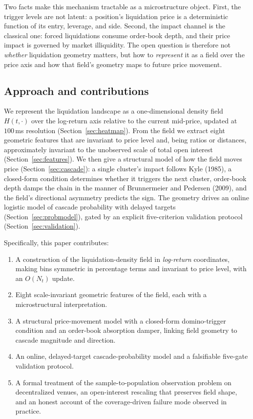 \documentclass[11pt,a4paper]{article}
\theoremstyle{definition}
\theoremstyle{plain}
\begin{document}
Two facts make this mechanism tractable as a microstructure object. First, the trigger levels are
not latent: a position's liquidation price is a deterministic function of its entry, leverage, and
side. Second, the impact channel is the classical one: forced liquidations consume order-book
depth, and their price impact is governed by market illiquidity. The open question is therefore not
\emph{whether} liquidation geometry matters, but how to \emph{represent} it as a field over the
price axis and how that field's geometry maps to future price movement.

\subsection{Approach and contributions}

We represent the liquidation landscape as a one-dimensional density field $H(t,\cdot)$ over the
log-return axis relative to the current mid-price, updated at $100\,$ms resolution
(Section~\ref{sec:heatmap}). From the field we extract eight geometric features that are invariant
to price level and, being ratios or distances, approximately invariant to the unobserved scale of
total open interest (Section~\ref{sec:features}). We then give a structural model of how the field
moves price (Section~\ref{sec:cascade}): a single cluster's impact follows Kyle (1985), a
closed-form condition determines whether it triggers the next cluster, order-book depth damps the
chain in the manner of Brunnermeier and Pedersen (2009), and the field's directional asymmetry
predicts the sign. The geometry drives an online logistic model of cascade probability with delayed
targets (Section~\ref{sec:probmodel}), gated by an explicit five-criterion validation protocol
(Section~\ref{sec:validation}).

Specifically, this paper contributes:
\begin{enumerate}
  \item A construction of the liquidation-density field in \emph{log-return} coordinates, making
        bins symmetric in percentage terms and invariant to price level, with an $O(N_t)$ update.
  \item Eight scale-invariant geometric features of the field, each with a microstructural
        interpretation.
  \item A structural price-movement model with a closed-form domino-trigger condition and an
        order-book absorption damper, linking field geometry to cascade magnitude and direction.
  \item An online, delayed-target cascade-probability model and a falsifiable five-gate validation
        protocol.
  \item A formal treatment of the sample-to-population observation problem on decentralized venues,
        an open-interest rescaling that preserves field shape, and an honest account of the
        coverage-driven failure mode observed in practice.
\end{enumerate}
\end{document}
